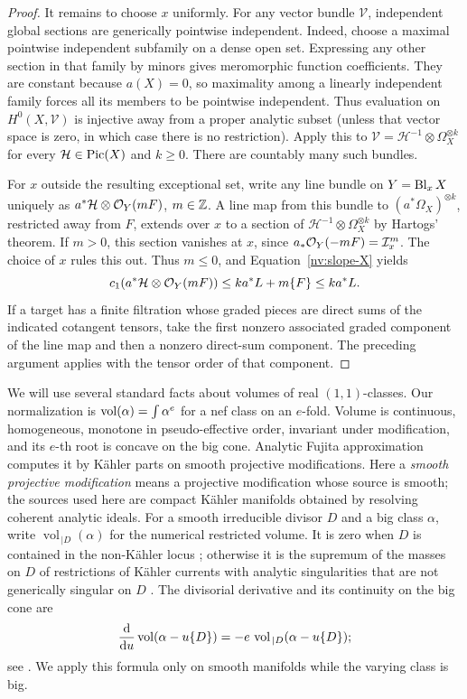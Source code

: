 \begin{proof}
It remains to choose \(x\) uniformly.  For any vector bundle
\(\mathscr V\), independent global sections are generically pointwise
independent.  Indeed, choose a maximal pointwise independent subfamily on
a dense open set.  Expressing any other section in that family by minors
gives meromorphic function coefficients.  They are constant because
\(a(X)=0\), so maximality among a linearly independent family forces all
its members to be pointwise independent.  Thus evaluation on
\(H^0(X,\mathscr V)\) is injective away from a proper analytic subset
(unless that vector space is zero, in which case there is no restriction).
Apply this to
\(\mathscr V=\mathscr H^{-1}\otimes\Omega_X^{\otimes k}\) for every
\(\mathcal{H}\in\operatorname{Pic}(X)\) and \(k\ge0\).  There are countably many such
bundles.

For \(x\) outside the resulting exceptional set, write any line bundle on
\(Y=\operatorname{Bl}_xX\) uniquely as
\(a^*\mathcal{H}\otimes\mathcal O_Y(mF)\), \(m\in\mathbb Z\).  A line map from this bundle
to \((a^*\Omega_X)^{\otimes k}\), restricted away from \(F\), extends over
\(x\) to a section of
\(\mathscr H^{-1}\otimes\Omega_X^{\otimes k}\) by Hartogs' theorem.  If
\(m>0\), this section vanishes at \(x\), since
\(a_*\mathcal O_Y(-mF)=\mathcal I_x^m\).  The choice of \(x\) rules this out.
Thus \(m\le0\), and Equation~\eqref{nv:slope-X} yields
\[
 c_1(a^*\mathcal{H}\otimes\mathcal O_Y(mF))
 \le k a^*L+m\{F\}\le k a^*L.
\]
If a target has a finite filtration whose graded pieces are direct sums
of the indicated cotangent tensors, take the first nonzero associated
graded component of the line map and then a nonzero direct-sum component.
The preceding argument applies with the tensor order of that component.
\end{proof}

We will use several standard facts about volumes of real \((1,1)\)-classes.
Our normalization is \(\operatorname{vol}(\alpha)=\int\alpha^e\) for a nef class on an
\(e\)-fold.  Volume is continuous, homogeneous, monotone in
pseudo-effective order, invariant under modification, and its \(e\)-th
root is concave on the big cone.  Analytic Fujita approximation computes
it by Kähler parts on smooth projective modifications.  Here a
\emph{smooth projective modification} means a projective modification
whose source is smooth; the sources used here are compact Kähler
manifolds obtained by resolving coherent analytic ideals.  For a smooth
irreducible divisor \(D\) and a big class \(\alpha\), write
\(\operatorname{vol}_{\,|D}(\alpha)\) for the numerical restricted volume.
It is zero when \(D\) is contained in the non-Kähler locus
\cite[Theorem~1.1]{Vu2023}; otherwise it is
the supremum of the masses on \(D\) of restrictions of Kähler currents
with analytic singularities that are not generically singular on \(D\)
\cite[Lemma~2.7]{CollinsTosatti2018}.  The divisorial derivative and its
continuity on the big cone are
\begin{equation}\label{nv:volume-derivative}
 \frac{\mathrm d}{\mathrm d u}\operatorname{vol}(\alpha-u\{D\})
   =-e\,\operatorname{vol}_{\,|D}(\alpha-u\{D\});
\end{equation}
see \cite[Theorem~1.1]{Vu2023}.  We apply this formula only on smooth
manifolds while the varying class is big.

